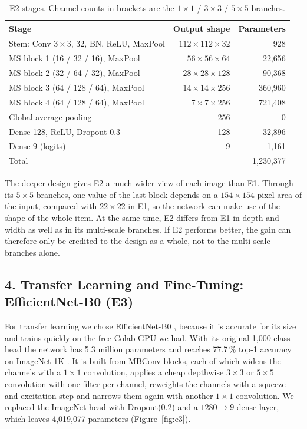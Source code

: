 \documentclass{article}
\begin{document}
\begin{table}[H]
\centering
\caption{E2 stages. Channel counts in brackets are the $1\times1$ / $3\times3$ / $5\times5$ branches.}
\label{tab:e2}
\begin{tabular}{lrr}
\toprule
Stage & Output shape & Parameters \\
\midrule
Stem: Conv $3\times3$, 32, BN, ReLU, MaxPool & $112\times112\times32$ & 928 \\
MS block 1 (16 / 32 / 16), MaxPool & $56\times56\times64$ & 22,656 \\
MS block 2 (32 / 64 / 32), MaxPool & $28\times28\times128$ & 90,368 \\
MS block 3 (64 / 128 / 64), MaxPool & $14\times14\times256$ & 360,960 \\
MS block 4 (64 / 128 / 64), MaxPool & $7\times7\times256$ & 721,408 \\
Global average pooling & 256 & 0 \\
Dense 128, ReLU, Dropout 0.3 & 128 & 32,896 \\
Dense 9 (logits) & 9 & 1,161 \\
\midrule
Total & & 1,230,377 \\
\bottomrule
\end{tabular}
\end{table}

The deeper design gives E2 a much wider view of each image than E1. Through its $5\times5$ branches, one value of the last block depends on a $154\times154$ pixel area of the input, compared with $22\times22$ in E1, so the network can make use of the shape of the whole item. At the same time, E2 differs from E1 in depth and width as well as in its multi-scale branches. If E2 performs better, the gain can therefore only be credited to the design as a whole, not to the multi-scale branches alone.

\subsection{4. Transfer Learning and Fine-Tuning: EfficientNet-B0 (E3)}

For transfer learning we chose EfficientNet-B0 \cite{efficientnet}, because it is accurate for its size and trains quickly on the free Colab GPU we had. With its original 1,000-class head the network has 5.3 million parameters and reaches 77.7\,\% top-1 accuracy on ImageNet-1K \cite{torchvision}. It is built from MBConv blocks, each of which widens the channels with a $1\times1$ convolution, applies a cheap depthwise $3\times3$ or $5\times5$ convolution with one filter per channel, reweights the channels with a squeeze-and-excitation step and narrows them again with another $1\times1$ convolution. We replaced the ImageNet head with Dropout(0.2) and a $1280\to9$ dense layer, which leaves 4,019,077 parameters (Figure~\ref{fig:e3}).
\end{document}
